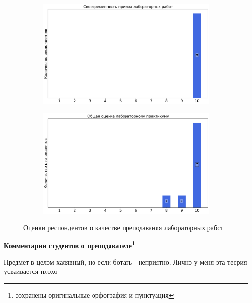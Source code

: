 \begin{figure}[H]
\begin{subfigure}[b]{0.45\textwidth}
			\end{subfigure}
			\begin{subfigure}[b]{0.45\textwidth}
				\centering
				\includegraphics[width=\textwidth]{images/3 course/Радиофизическая лаборатория/labniks-marks-Борисов Д.А.-2.png}
			\end{subfigure}
			\begin{subfigure}[b]{0.45\textwidth}
				\centering
				\includegraphics[width=\textwidth]{images/3 course/Радиофизическая лаборатория/labniks-marks-Борисов Д.А.-3.png}
			\end{subfigure}	
			\caption{Оценки респондентов о качестве преподавания лабораторных работ}
		\end{figure}

		\textbf{Комментарии студентов о преподавателе\protect\footnote{сохранены оригинальные орфография и пунктуация}}
            \begin{commentbox} 
                Предмет в целом халявный, но если ботать - неприятно. Лично у меня эта теория усваивается плохо 
            \end{commentbox} 


